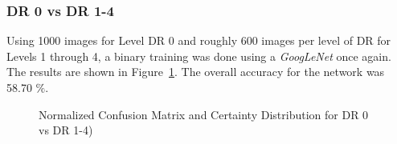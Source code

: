 \documentclass[letterpaper,12pt]{article}
\newcommand{\figref}[1]{Figure~\ref{#1}}
\begin{document}
\subsubsection{DR 0 vs DR 1-4}

Using 1000 images for Level DR 0 and roughly 600 images per level of DR for Levels 1 through 4, a binary training was done using a \textit{GoogLeNet} once again. The results are shown in \figref{DR0_DR+}. The overall accuracy for the network was 58.70 $\%$.

\begin{figure}[htbp]
\begin{center}
\caption{Normalized Confusion Matrix and Certainty Distribution for DR 0 vs DR 1-4)}
\label{DR0_DR+}
\end{center}
\end{figure}
\end{document}
